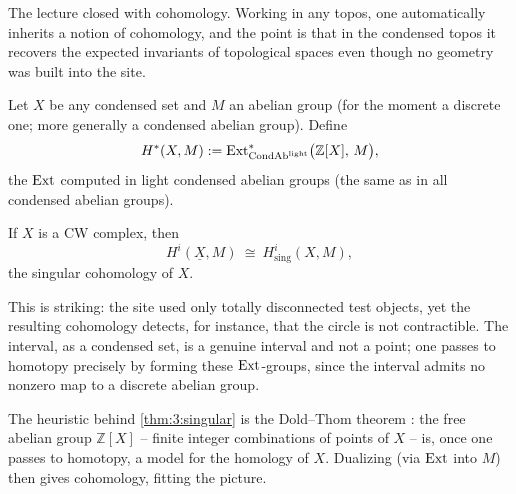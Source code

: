 The lecture closed with cohomology. Working in any topos, one automatically
inherits a notion of cohomology, and the point is that in the condensed topos it
recovers the expected invariants of topological spaces even though no geometry
was built into the site.

\begin{definition}
\label{def:3:cohomology}
Let $X$ be any condensed set and $M$ an abelian group (for the moment a discrete
one; more generally a condensed abelian group). Define
\begin{equation*}
H^{*}(X,M):=\operatorname{Ext}^{*}_{\mathrm{CondAb}^{\mathrm{light}}}\bigl(\mathbb{Z}[X],\,M\bigr),
\end{equation*}
the $\operatorname{Ext}$ computed in light condensed abelian groups (the same as in all
condensed abelian groups).
\end{definition}

\begin{theorem}
\label{thm:3:singular}
If $X$ is a CW complex, then
\begin{equation*}
H^{i}(\underline{X},M)\ \cong\ H^{i}_{\mathrm{sing}}(X,M),
\end{equation*}
the singular cohomology of $X$.
\end{theorem}

\begin{remark}
\label{rmk:3:geometry-out-of-nothing}
This is striking: the site used only totally disconnected test objects, yet the
resulting cohomology detects, for instance, that the circle is not contractible.
The interval, as a condensed set, is a genuine interval and not a point; one
passes to homotopy precisely by forming these $\operatorname{Ext}$-groups, since the interval
admits no nonzero map to a discrete abelian group.
\end{remark}

\begin{remark}
\label{rmk:3:dold-thom}
The heuristic behind \cref{thm:3:singular} is the Dold--Thom theorem
\cite{Dold_1958}: the free abelian group $\mathbb{Z}[X]$ -- finite integer
combinations of points of $X$ -- is, once one passes to homotopy, a model for
the homology of $X$. Dualizing (via $\operatorname{Ext}$ into $M$) then gives cohomology,
fitting the picture.
\end{remark}

